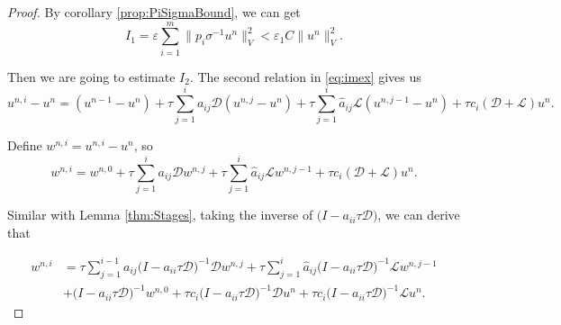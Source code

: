 \documentclass[a4paper, oneside]{book}
\def\epsilon{\varepsilon}
\def\bbone{{\mathbbm{1}}}
\def\hata{{\hat{a}}}
\def\hatA{{\hat{A}}}
\def\calD{{\mathcal{D}}}
\def\calL{{\mathcal{L}}}
\begin{document}
\begin{proof}
By corollary \ref{prop:PiSigmaBound}, we can get
$$I_1 = \epsilon \sum_{i=1}^m\big\|p_i \sigma^{-1}u^n\big\|_V^2 < \epsilon_1 C \big\|u^n\big\|_V^2.$$



Then we are going to estimate $I_2$. The second relation in \ref{eq:imex} gives us
$$u^{n,i}-u^n = (u^{n-1}-u^n) + \tau \sum\limits_{j=1}^ia_{ij}\calD(u^{n,j}-u^n) + \tau \sum\limits_{j=1}^i\hata_{ij}\calL(u^{n,j-1}-u^n) + \tau c_i(\calD+\calL)u^n.$$

Define $w^{n,i} = u^{n,i}-u^n$, so
$$w^{n,i} = w^{n,0} + \tau \sum\limits_{j=1}^ia_{ij}\calD w^{n,j} + \tau \sum\limits_{j=1}^i\hata_{ij}\calL w^{n,j-1} + \tau c_i(\calD+\calL)u^n.$$

Similar with Lemma \ref{thm:Stages}, taking the inverse of $\big(I-a_{ii}\tau \calD\big)$, we can derive that

\begin{align*}w^{n,i} &= \tau \sum\limits_{j=1}^{i-1}a_{ij}\big(I-a_{ii}\tau \calD\big)^{-1}\calD w^{n,j} 
+ \tau \sum\limits_{j=1}^i\hata_{ij}\big(I-a_{ii}\tau \calD\big)^{-1}\calL w^{n,j-1} \\
&+ \big(I-a_{ii}\tau \calD\big)^{-1}w^{n,0} 
+ \tau c_i\big(I-a_{ii}\tau \calD\big)^{-1}\calD u^n+ \tau c_i\big(I-a_{ii}\tau \calD\big)^{-1}\calL u^n. 
\end{align*}




\end{proof}
\end{document}
